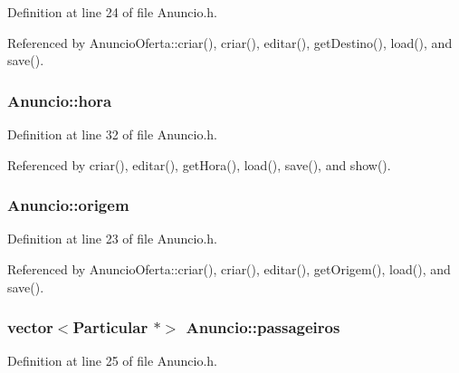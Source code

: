 Definition at line 24 of file Anuncio.\+h.



Referenced by Anuncio\+Oferta\+::criar(), criar(), editar(), get\+Destino(), load(), and save().

\hypertarget{class_anuncio_aee851839cb45594b8ee550a032236cfe}{
\subsubsection[{hora}]{ Anuncio\+::hora\hspace{0.3cm}{\ttfamily [protected]}}}\label{class_anuncio_aee851839cb45594b8ee550a032236cfe}


Definition at line 32 of file Anuncio.\+h.



Referenced by criar(), editar(), get\+Hora(), load(), save(), and show().

\hypertarget{class_anuncio_a9b3f8ac29ebf2a44e24ea2273064a7f5}{
\subsubsection[{origem}]{ Anuncio\+::origem\hspace{0.3cm}{\ttfamily [protected]}}}\label{class_anuncio_a9b3f8ac29ebf2a44e24ea2273064a7f5}


Definition at line 23 of file Anuncio.\+h.



Referenced by Anuncio\+Oferta\+::criar(), criar(), editar(), get\+Origem(), load(), and save().

\hypertarget{class_anuncio_a76cdb1291df7bd8736141304d759ef35}{
\subsubsection[{passageiros}]{\setlength{\rightskip}{0pt plus 5cm}vector$<${\bf Particular} $\ast$$>$ Anuncio\+::passageiros\hspace{0.3cm}{\ttfamily [protected]}}}\label{class_anuncio_a76cdb1291df7bd8736141304d759ef35}


Definition at line 25 of file Anuncio.\+h.




